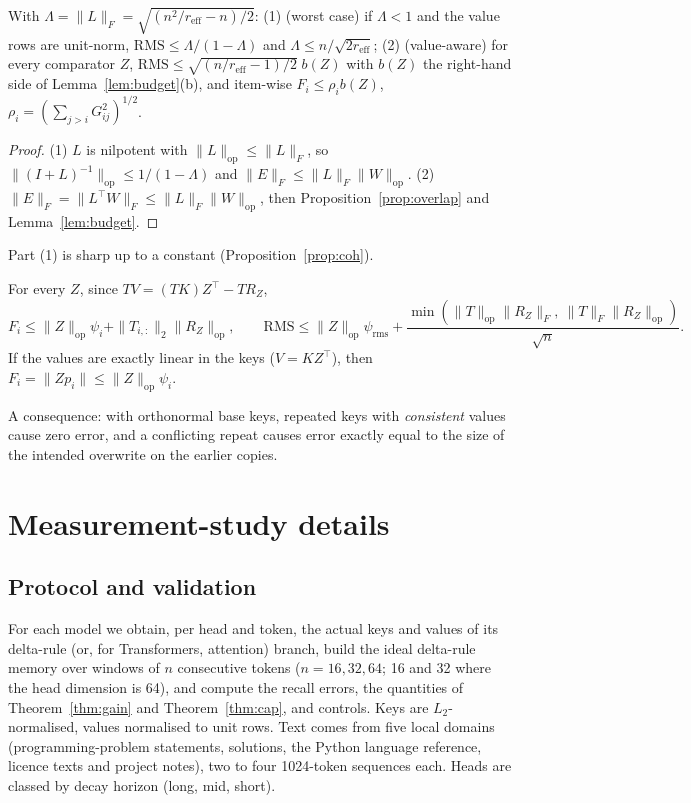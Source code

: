 \begin{theorem}\label{thm:rank}
With $\Lambda=\|L\|_F=\sqrt{(n^2/r_{\mathrm{eff}}-n)/2}$: (1) (worst case) if $\Lambda<1$ and the value rows are unit-norm, $\mathrm{RMS}\le\Lambda/(1-\Lambda)$ and $\Lambda\le n/\sqrt{2r_{\mathrm{eff}}}$; (2) (value-aware) for every comparator $Z$, $\mathrm{RMS}\le\sqrt{(n/r_{\mathrm{eff}}-1)/2}\;b(Z)$ with $b(Z)$ the right-hand side of Lemma~\ref{lem:budget}(b), and item-wise $F_i\le\rho_ib(Z)$, $\rho_i=(\sum_{j>i}G_{ij}^2)^{1/2}$.
\end{theorem}
\begin{proof}
(1) $L$ is nilpotent with $\|L\|_{\mathrm{op}}\le\|L\|_F$, so $\|(I+L)^{-1}\|_{\mathrm{op}}\le1/(1-\Lambda)$ and $\|E\|_F\le\|L\|_F\|W\|_{\mathrm{op}}$. (2) $\|E\|_F=\|L^\top W\|_F\le\|L\|_F\|W\|_{\mathrm{op}}$, then Proposition~\ref{prop:overlap} and Lemma~\ref{lem:budget}.
\end{proof}
Part (1) is sharp up to a constant (Proposition~\ref{prop:coh}).

\begin{theorem}\label{thm:transfer}
For every $Z$, since $TV=(TK)Z^\top-TR_Z$,
\[
F_i\le\|Z\|_{\mathrm{op}}\psi_i+\|T_{i,:}\|_2\|R_Z\|_{\mathrm{op}},\qquad \mathrm{RMS}\le\|Z\|_{\mathrm{op}}\psi_{\mathrm{rms}}+\frac{\min(\|T\|_{\mathrm{op}}\|R_Z\|_F,\ \|T\|_F\|R_Z\|_{\mathrm{op}})}{\sqrt n}.
\]
If the values are exactly linear in the keys ($V=KZ^\top$), then $F_i=\|Zp_i\|\le\|Z\|_{\mathrm{op}}\psi_i$.
\end{theorem}
A consequence: with orthonormal base keys, repeated keys with \emph{consistent} values cause zero error, and a conflicting repeat causes error exactly equal to the size of the intended overwrite on the earlier copies.

\section{Measurement-study details}\label{app:measure}
\subsection{Protocol and validation}
For each model we obtain, per head and token, the actual keys and values of its delta-rule (or, for Transformers, attention) branch, build the ideal delta-rule memory over windows of $n$ consecutive tokens ($n=16,32,64$; 16 and 32 where the head dimension is 64), and compute the recall errors, the quantities of Theorem~\ref{thm:gain} and Theorem~\ref{thm:cap}, and controls. Keys are $L_2$-normalised, values normalised to unit rows. Text comes from five local domains (programming-problem statements, solutions, the Python language reference, licence texts and project notes), two to four 1024-token sequences each. Heads are classed by decay horizon (long, mid, short).


